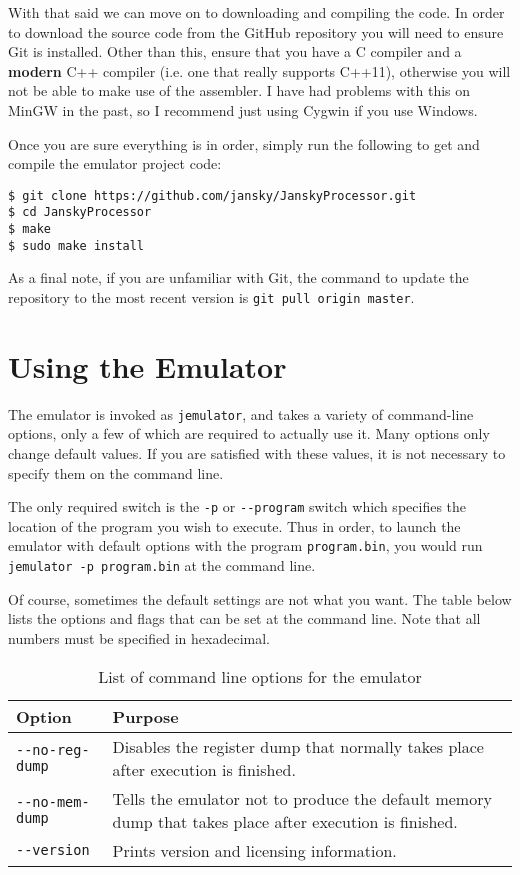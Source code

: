\documentclass[12pt,letterpaper,titlepage,twoside]{book}
\begin{document}
With that said we can move on to downloading and compiling the code. In order to download the source code from the GitHub repository you will need to ensure Git is installed. Other than this, ensure that you have a C compiler and a \textbf{modern} C++ compiler (i.e. one that really supports C++11), otherwise you will not be able to make use of the assembler. I have had problems with this on MinGW in the past, so I recommend just using Cygwin if you use Windows.

Once you are sure everything is in order, simply run the following to get and compile the emulator project code:

\begin{verbatim}
$ git clone https://github.com/jansky/JanskyProcessor.git
$ cd JanskyProcessor
$ make
$ sudo make install
\end{verbatim}

As a final note, if you are unfamiliar with Git, the command to update the repository to the most recent version is \verb|git pull origin master|.
\section{Using the Emulator}
The emulator is invoked as \verb|jemulator|, and takes a variety of command-line options, only a few of which are required to actually use it. Many options only change default values. If you are satisfied with these values, it is not necessary to specify them on the command line.

The only required switch is the \verb|-p| or \verb|--program| switch which specifies the location of the program you wish to execute. Thus in order, to launch the emulator with default options with the program \verb|program.bin|, you would run \verb|jemulator -p program.bin| at the command line.

Of course, sometimes the default settings are not what you want. The table below lists the options and flags that can be set at the command line. Note that all numbers must be specified in hexadecimal.

\begin{table}[H]
\centering
\begin{tabular}{|p{3cm}|p{6cm}|}
\hline  \textbf{Option} & \textbf{Purpose}   \\ 
\hline  \verb|--no-reg-dump| & Disables the register dump that normally takes place after execution is finished. \\ 
\hline  \verb|--no-mem-dump| & Tells the emulator not to produce the default memory dump that takes place after execution is finished. \\
\hline  \verb|--version| & Prints version and licensing information. \\
\hline 
\end{tabular} 
\caption{List of command line options for the emulator}
\end{table}
\end{document}
